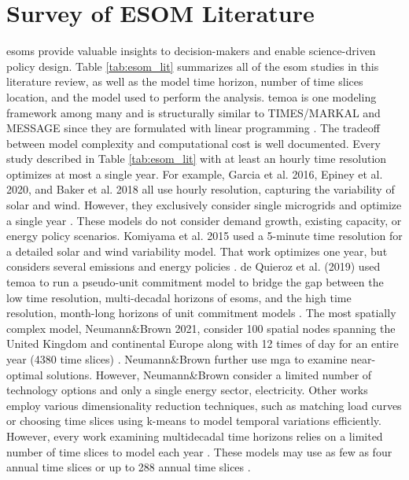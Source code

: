 \section{Survey of ESOM Literature}

\glspl{esom} provide valuable insights to decision-makers and enable science-driven
policy design. Table \ref{tab:esom_lit}
summarizes all of the \gls{esom} studies in this literature review, as well as
the model time horizon, number of time slices location, and the model used to
perform the analysis.
\gls{temoa}
is one modeling framework among many and is structurally similar to TIMES/MARKAL
and MESSAGE since they are formulated with linear programming \cite{yue_review_2018}.
The tradeoff between model complexity and computational cost is well documented.
Every study described in Table \ref{tab:esom_lit} with at least an hourly
time resolution optimizes at most a single year. For example, Garcia et al. 2016,
Epiney et al. 2020, and Baker et al. 2018 all use hourly resolution, capturing
the variability of solar and wind. However, they exclusively consider single microgrids
and optimize a single year
\cite{epiney_economic_2020,baker_optimal_2018,garcia_dynamic_2016}.
These models do not consider demand growth, existing capacity, or energy policy
scenarios. Komiyama et al. 2015 used a 5-minute time resolution for a detailed
solar and wind variability model. That work optimizes one year, but
considers several emissions and energy policies \cite{komiyama_energy_2015}.
de Quieroz et al. (2019) used \gls{temoa} to run a
pseudo-unit commitment model to bridge the gap between the low time resolution,
multi-decadal horizons of \glspl{esom}, and the high time resolution, month-long
horizons of unit commitment models \cite{de_queiroz_repurposing_2019}.
The most spatially complex model, Neumann\&Brown 2021, consider 100 spatial nodes
spanning the United Kingdom and continental Europe along with 12 times of day for
an entire year (4380 time slices) \cite{neumann_near-optimal_2021}. Neumann\&Brown
further use \gls{mga} to examine near-optimal solutions. However, Neumann\&Brown consider
a limited number of technology options and only a single energy sector, electricity.
Other works employ various dimensionality reduction techniques, such as matching
load curves \cite{de_sisternes_value_2016,poncelet_impact_2016} or choosing time
slices using k-means \cite{kotzur_impact_2018} to model temporal variations efficiently.
However, every work examining multidecadal time horizons relies on a limited number
of time slices to model each year
\cite{alzbutas_uncertainty_2012,barron_differential_2015,bennett_extending_2021,
bouckaert_expanding_2014,decarolis_modelling_2016,li_open_2020,poncelet_impact_2016,
seck_embedding_2020,yue_least_2020}. These models may use as few as four annual
time slices \cite{decarolis_modelling_2016} or up to 288 annual time slices
\cite{poncelet_impact_2016}.


